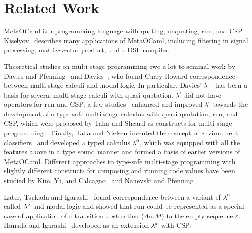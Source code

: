 
\section{Related Work}
\label{sec:related-work}


MetaOCaml is a programming language with quoting, unquoting, run, and CSP.
Kiselyov~\cite{8384206} describes many applications of MetaOCaml, including
filtering in signal processing, matrix-vector product, and a DSL compiler.


Theoretical studies on multi-stage programming owe a lot to seminal work by
Davies and Pfenning~\cite{DaviesPfenning01JACM} and
Davies~\cite{davies1996temporal}, who found Curry-Howard correspondence
between multi-stage calculi and modal logic. In particular, Davies'
$\lambda^\circ$~\cite{davies1996temporal} has been a basis for several
multi-stage calculi with quasi-quotation. $\lambda^\circ$ did not have
operators for run and CSP; a few
studies~\cite{benaissa1999logical,MoggiTahaBenaissaSheard99ESOP} enhanced and
improved $\lambda^\circ$ towards the development of a type-safe multi-stage
calculus with quasi-quotation, run, and CSP, which were proposed by Taha and
Sheard as constructs for multi-stage programming~\cite{MetaML}. 
Finally, Taha and Nielsen invented the concept of environment
classifiers~\cite{taha2003environment} and developed a typed calculus
$\lambda^\alpha$, which was equipped with all the features above in a type
sound manner and formed a basis of earlier versions of MetaOCaml. Different
approaches to type-safe multi-stage programming with slightly different
constructs for composing and running code values have been studied by Kim,
Yi, and Calcagno~\cite{DBLP:conf/popl/KimYC06} and Nanevski and
Pfenning~\cite{DBLP:journals/jfp/NanevskiP05}.

Later, Tsukada and Igarashi~\cite{Tsukada} found correspondence
between a variant of \(\lambda^\alpha\) called $\lambda^{\mathop{\triangleright}}$
and modal logic and showed that run could be represented as a special
case of application of a transition abstraction ($\Lambda\alpha.M$) to
the empty sequence $\varepsilon$.  Hanada and
Igarashi~\cite{Hanada2014} developed \LTP as an extension
$\lambda^{\mathop{\triangleright}}$ with CSP.

